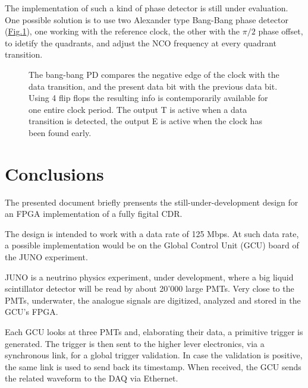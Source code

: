 \documentclass[letterpaper,10pt,english,openany,oneside]{sphinxmanual}
\begin{document}
The implementation of such a kind of phase detector is still under evaluation. One possible solution is to use two Alexander type Bang-Bang phase detector (\hyperref[\detokenize{paper/phase_detector:bbpd}]{Fig.\@ \ref{\detokenize{paper/phase_detector:bbpd}}}), one working with the reference clock, the other with the \(\pi / 2\) phase offset, to idetify the quadrants, and adjust the NCO frequency at every quadrant transition.

\begin{figure}[htbp]
\centering
\capstart

\noindent{}
\caption{The bang-bang PD compares the negative edge of the clock with the data transition, and the present data bit with the previous data bit. Using 4 flip flops the resulting info is contemporarily available for one entire clock period. The output T is active when a data transition is detected, the output E is active when the clock has been found early.}\label{\detokenize{paper/phase_detector:id2}}\label{\detokenize{paper/phase_detector:bbpd}}\end{figure}


\chapter{Conclusions}
\label{\detokenize{paper/conclusions:conclusions}}\label{\detokenize{paper/conclusions::doc}}
The presented document briefly prensents the still-under-development design for an FPGA implementation of a fully figital CDR.

The design is intended to work with a data rate of 125 Mbps. At such data rate, a possible implementation would be on the Global Control Unit (GCU) board of the JUNO experiment.

\begin{DUlineblock}{0em}
\item[] JUNO is a neutrino physics experiment, under development, where a big liquid scintillator detector will be read by about 20’000 large PMTs. Very close to the PMTs, underwater, the analogue signals are digitized, analyzed and stored in the GCU’s FPGA.
\item[] Each GCU looks at three PMTs and, elaborating their data, a primitive trigger is generated. The trigger is then sent to the higher lever electronics, via a synchronous link, for a global trigger validation. In case the validation is positive, the same link is used to send back its timestamp. When received, the GCU sends the related waveform to the DAQ via Ethernet.
\end{DUlineblock}
\end{document}
